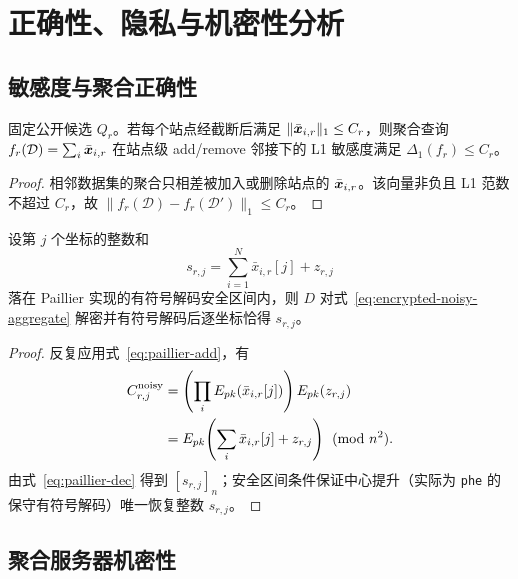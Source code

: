\section{正确性、隐私与机密性分析}

\subsection{敏感度与聚合正确性}

\begin{lemma}[单轮站点级敏感度]
固定公开候选 $Q_r$。若每个站点经截断后满足 $\|\bar{\bm{x}}_{i,r}\|_1\leq C_r$，则聚合查询
$f_r(\mathcal D)=\sum_i\bar{\bm{x}}_{i,r}$ 在站点级 add/remove 邻接下的 L1 敏感度满足 $\Delta_1(f_r)\leq C_r$。
\end{lemma}
\begin{proof}
相邻数据集的聚合只相差被加入或删除站点的 $\bar{\bm{x}}_{i,r}$。该向量非负且 L1 范数不超过 $C_r$，故
$\|f_r(\mathcal D)-f_r(\mathcal D')\|_1\leq C_r$。
\end{proof}

\begin{proposition}
设第 $j$ 个坐标的整数和
\begin{equation}
 s_{r,j}=\sum_{i=1}^{N}\bar{x}_{i,r}[j]+z_{r,j}
 \label{eq:signed-sum}
\end{equation}
落在 Paillier 实现的有符号解码安全区间内，则 $D$ 对式~\eqref{eq:encrypted-noisy-aggregate} 解密并有符号解码后逐坐标恰得 $s_{r,j}$。
\end{proposition}
\begin{proof}
反复应用式~\eqref{eq:paillier-add}，有
\begin{align*}
C^{\rm noisy}_{r,j}
&=\left(\prod_i E_{pk}(\bar{x}_{i,r}[j])\right)E_{pk}(z_{r,j})\\
&=E_{pk}\!\left(\sum_i\bar{x}_{i,r}[j]+z_{r,j}\right)\pmod{n^2}.
\end{align*}
由式~\eqref{eq:paillier-dec} 得到 $[s_{r,j}]_n$；安全区间条件保证中心提升（实际为 \texttt{phe} 的保守有符号解码）唯一恢复整数 $s_{r,j}$。
\end{proof}

\subsection{聚合服务器机密性}

